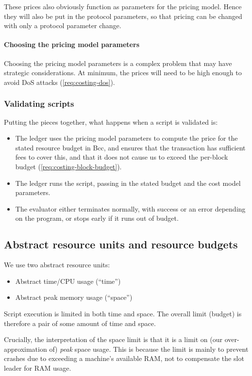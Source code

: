 These prices also obviously function as parameters for the pricing model.
Hence they will also be put in the protocol parameters, so that pricing can be changed with only a protocol parameter change.

\paragraph{Choosing the pricing model parameters}
Choosing the pricing model parameters is a complex problem that may have strategic considerations.
At minimum, the prices will need to be high enough to avoid DoS attacks (\cref{req:costing-dos}).

\subsubsection{Validating scripts}
Putting the pieces together, what happens when a script is validated is:
\begin{itemize}
\item
  The ledger uses the pricing model parameters to compute the price for the stated resource budget in Bcc, and ensures that the transaction has sufficient fees to cover this, and that it does not cause us to exceed the per-block budget (\cref{req:costing-block-budget}).
\item
  The ledger runs the script, passing in the stated budget and the cost model parameters.
\item
  The evaluator either terminates normally, with success or an error depending on the program, or stops early if it runs out of budget.
\end{itemize}

\subsection{Abstract resource units and resource budgets}
\label{sec:costing-units}
We use two abstract resource units:
\begin{itemize}
\item Abstract time/CPU usage (``\gls{time}'')
\item Abstract peak memory usage (``\gls{space}'')
\end{itemize}

Script execution is limited in both \gls{time} and \gls{space}.
The overall limit (budget) is therefore a pair of some amount of \gls{time} and \gls{space}.

Crucially, the interpretation of the \gls{space} limit is that it is a limit on (our over-approximation of) \emph{peak} space usage.
This is because the limit is mainly to prevent crashes due to exceeding a machine's available RAM, not to compensate the slot leader for RAM usage.

